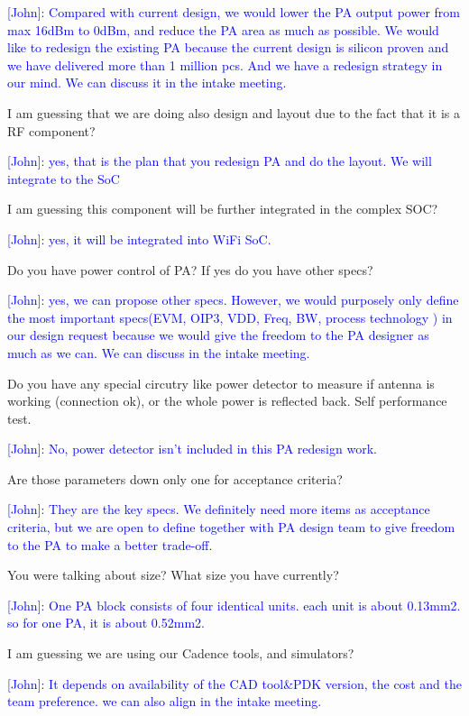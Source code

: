 \documentclass{article}
\begin{document}
\textcolor{blue}{[John]: Compared with current design, we would lower the PA output power from max 16dBm to 0dBm, and reduce the PA area as much as possible. We would like to redesign the existing PA because the current design is silicon proven and we have delivered more than 1 million pcs. And we have a redesign strategy in our mind. We can discuss it in the intake meeting.}

I am guessing that we are doing also design and layout due to the fact that it is a RF component?

\textcolor{blue}{[John]:  yes, that is the plan that  you redesign PA and do the layout. We will integrate to the SoC }

I am guessing this component will be further integrated in the complex SOC? 

\textcolor{blue}{[John]: yes, it will be integrated into WiFi SoC. }

Do you have power control of PA?  If yes do you have other specs? 

\textcolor{blue}{[John]: yes, we can propose other specs. However, we would purposely only define the most important specs(EVM, OIP3, VDD, Freq, BW, process technology ) in our design request because we would give the freedom to the PA designer as much as we can. We can discuss  in the intake meeting. }

Do you have any special circutry like power detector to measure if antenna is working (connection ok), or the whole power is reflected back. Self performance test.

\textcolor{blue}{[John]: No, power detector isn't included in this PA redesign work.  } 

Are those parameters down only one for acceptance criteria?

\textcolor{blue}{[John]: They are the key specs. We definitely need more items as acceptance criteria, but we are open to define together with PA design team to give freedom to the PA to make a better trade-off.  }

You were talking about size? What size you have currently?

\textcolor{blue}{[John]: One PA block consists of four identical units. each unit is about 0.13mm2. so for one PA, it is about 0.52mm2.   }

I am guessing we are using our Cadence tools, and simulators?

\textcolor{blue}{[John]: It depends on availability of the CAD tool\&PDK version, the cost and the team preference. we can also align in the intake meeting.} 
\end{document}
